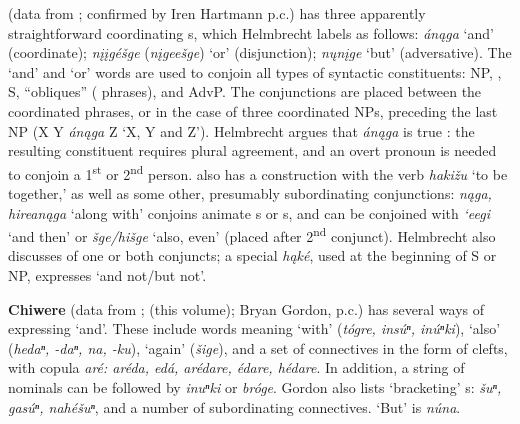 \documentclass[output=paper]{LSP/langsci}
\begin{document}
\textbf{} (data from \citealt{Helmbrecht2004}; confirmed by Iren Hartmann p.c.) has three apparently straightforward coordinating s, which Helmbrecht labels as follows: \textit{án\k{a}ga} `and' (coordinate); \textit{n\k{i}\k{i}gé\v{s}ge} (\textit{n\k{i}gee\v{s}ge}) `or' (disjunction); \textit{n\k{u}n\k{i}ge} `but' (adversative). The `and' and `or' words are used to conjoin all types of syntactic constituents: NP, , S, ``obliques'' ( phrases), and AdvP. The conjunctions are placed between the coordinated phrases, or in the case of three coordinated NPs, preceding the last NP (X Y \textit{án\k{a}ga} Z `X, Y and Z'). Helmbrecht argues that \textit{án\k{a}ga}  is true : the resulting constituent requires plural agreement, and an overt pronoun is needed to conjoin a 1\textsuperscript{st} or 2\textsuperscript{nd} person.  also has a  construction with the verb \textit{haki\v{z}u} `to be together,' as well as some other, presumably subordinating conjunctions: \textit{n\k{a}ga, hirean\k{a}ga} `along with' conjoins animate s or s, and  can be conjoined with \textit{`eegi} `and then' or \textit{\v{s}ge/hi\v{s}ge} `also, even' (placed after 2\textsuperscript{nd} conjunct). Helmbrecht also discusses  of one or both conjuncts; a special  \textit{h\k{a}ké}, used at the beginning of S or NP, expresses `and not/but not'.

\textbf{Chiwere} (data from \citealt{Goodtracks1992}; \citealt{Greer2016} (this volume); Bryan Gordon, p.c.) has several ways of expressing `and'. These include words meaning `with' (\textit{tógre, insúⁿ, inúⁿki}), `also' (\textit{hedaⁿ, -daⁿ, na, -ku}), `again' (\textit{\v{s}ige}), and a set of  connectives in the form of clefts, with copula \textit{aré: aréda, edá, arédare, édare, hédare}. In addition, a string of nominals can be followed by \textit{inuⁿki} or \textit{bróge}. Gordon also lists `bracketing' s: \textit{\v{s}uⁿ, gasúⁿ, nahé\v{s}uⁿ}, and a number of subordinating connectives. `But' is \textit{núna}.

\subsection{}
 
\end{document}
